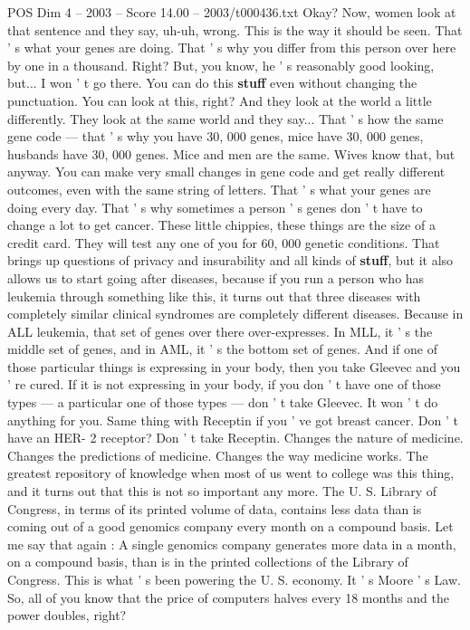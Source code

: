 \begin{textsample}{POS Dim 4 – 2003 – Score 14.00 – 2003/t000436.txt}
Okay?
Now, women look at that sentence and they say, uh-uh, wrong.
This is the way it should be seen.
That ' s what your genes are doing.
That ' s why you differ from this person over here by one in a thousand.
Right?
But, you know, he ' s reasonably good looking, but...
I won ' t go there.
You can do this \textbf{stuff} even without changing the punctuation.
You can look at this, right?
And they look at the world a little differently.
They look at the same world and they say...
That ' s how the same gene code — that ' s why you have 30, 000 genes, mice have 30, 000 genes, husbands have 30, 000 genes.
Mice and men are the same.
Wives know that, but anyway.
You can make very small changes in gene code and get really different outcomes, even with the same string of letters.
That ' s what your genes are doing every day.
That ' s why sometimes a person ' s genes don ' t have to change a lot to get cancer.
These little chippies, these things are the size of a credit card.
They will test any one of you for 60, 000 genetic conditions.
That brings up questions of privacy and insurability and all kinds of \textbf{stuff}, but it also allows us to start going after diseases, because if you run a person who has leukemia through something like this, it turns out that three diseases with completely similar clinical syndromes are completely different diseases.
Because in ALL leukemia, that set of genes over there over-expresses.
In MLL, it ' s the middle set of genes, and in AML, it ' s the bottom set of genes.
And if one of those particular things is expressing in your body, then you take Gleevec and you ' re cured.
If it is not expressing in your body, if you don ' t have one of those types — a particular one of those types — don ' t take Gleevec.
It won ' t do anything for you.
Same thing with Receptin if you ' ve got breast cancer.
Don ' t have an HER- 2 receptor?
Don ' t take Receptin.
Changes the nature of medicine.
Changes the predictions of medicine.
Changes the way medicine works.
The greatest repository of knowledge when most of us went to college was this thing, and it turns out that this is not so important any more.
The U.
S.
Library of Congress, in terms of its printed volume of data, contains less data than is coming out of a good genomics company every month on a compound basis.
Let me say that again : A single genomics company generates more data in a month, on a compound basis, than is in the printed collections of the Library of Congress.
This is what ' s been powering the U.
S. economy.
It ' s Moore ' s Law.
So, all of you know that the price of computers halves every 18 months and the power doubles, right?

\end{textsample}
